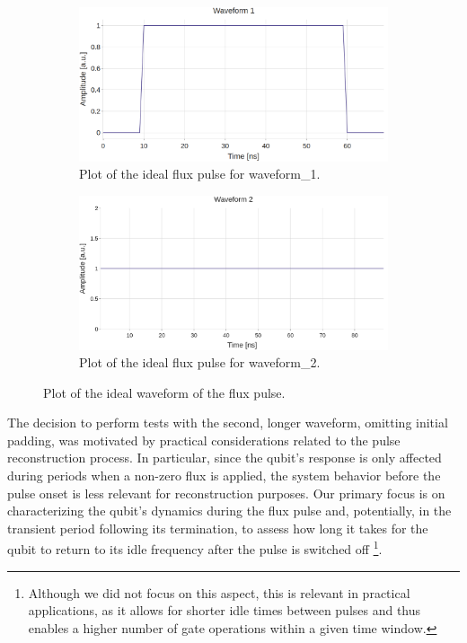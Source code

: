 \begin{figure}[h!]
    \centering    
    \begin{subfigure}[t]{0.495\textwidth}
        \includegraphics[width=\textwidth]{figures/png/Cryoscope/waveform1.png}
        \caption{Plot of the ideal flux pulse for waveform\_1.}
        \label{fig:waveform1}
    \end{subfigure}
    \hfill
    \begin{subfigure}[t]{0.495\textwidth}
        \includegraphics[width=\textwidth]{figures/png/Cryoscope/waveform2.png}
        \caption{Plot of the ideal flux pulse for waveform\_2.}
        \label{fig:waveform2}
    \end{subfigure}

    \caption{Plot of the ideal waveform of the flux pulse.}
    \label{fig:ideal_waveform}
\end{figure}

The decision to perform tests with the second, longer waveform, omitting initial padding, was motivated by practical considerations related to the pulse reconstruction process. 
In particular, since the qubit's response is only affected during periods when a non-zero flux is applied, the system behavior before the pulse onset is less relevant for reconstruction purposes.
Our primary focus is on characterizing the qubit's dynamics during the flux pulse and, potentially, in the transient period following its termination, to assess how long it takes for the qubit to return to its idle frequency after the pulse is switched off
\footnote{Although we did not focus on this aspect, this is relevant in practical applications, as it allows for shorter idle times between pulses and thus enables a higher number of gate operations within a given time window.}.

